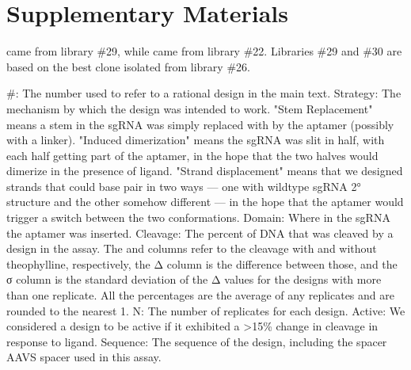 \documentclass[10pt,oneside]{article}
\begin{document}
\section{Supplementary Materials}






      \ligrnaF{} came from library \#29, while \ligrnaB{} came from library \#22.  Libraries \#29 and \#30 are based on the best clone isolated from library \#26.



    \#: The number used to refer to a rational design in the main text.
    Strategy: The mechanism by which the design was intended to work.  "Stem Replacement" means a stem in the sgRNA was simply replaced with by the aptamer (possibly with a linker).  "Induced dimerization" means the sgRNA was slit in half, with each half getting part of the aptamer, in the hope that the two halves would dimerize in the presence of ligand.  "Strand displacement" means that we designed strands that could base pair in two ways --- one with wildtype sgRNA 2° structure and the other somehow different --- in the hope that the aptamer would trigger a switch between the two conformations.
    Domain: Where in the sgRNA the aptamer was inserted.
    Cleavage: The percent of DNA that was cleaved by a design in the \invitro{} assay.  The \apo{} and \holo{} columns refer to the cleavage with and without theophylline, respectively, the Δ column is the difference between those, and the σ column is the standard deviation of the Δ values for the designs with more than one replicate.  All the percentages are the average of any replicates and are rounded to the nearest 1.
    N: The number of replicates for each design.
    Active: We considered a design to be active if it exhibited a >15\% change in cleavage in response to ligand.  
% 
% 
    Sequence: The sequence of the design, including the spacer AAVS spacer used in this assay.
\end{document}
